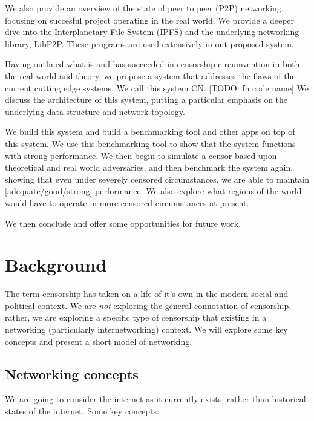 \documentclass[12pt]{report}
\begin{document}
We also provide an overview of the state of peer to peer (P2P) networking, focusing on succesful project operating in the real world. We provide a deeper dive into the Interplanetary File System (IPFS) and the underlying networking library, LibP2P. These programs are used extensively in out proposed system.

Having outlined what is and has succeeded in censorship circumvention in both the real world and theory, we propose a system that addresses the flaws of the current cutting edge systems. We call this system CN. [TODO: fn code name] We discuss the architecture of this system, putting a particular emphasis on the underlying data structure and network topology.

We build this system and build a benchmarking tool and other apps on top of this system. We use this benchmarking tool to show that the system functions with strong performance. We then begin to simulate a censor based upon theoretical and real world adversaries, and then benchmark the system again, showing that even under severely censored circumstances, we are able to maintain [adequate/good/strong] performance. We also explore what regions of the world would have to operate in more censored circumstances at present.

We then conclude and offer some opportunities for future work.

\chapter{Background}

The term censorship has taken on a life of it's own in the modern social and political context. We are \emph{not} exploring the general connotation of censorship, rather, we are exploring a specific type of censorship that existing in a networking (particularly internetworking) context. We will explore some key concepts and present a short model of networking.

\section{Networking concepts}

We are going to consider the internet as it currently exists, rather than historical states of the internet. Some key concepts:
\end{document}
